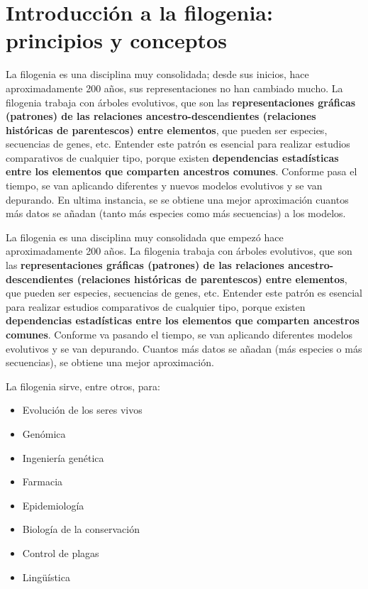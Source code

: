 \chapter{Introducción a la filogenia: principios y conceptos}
La filogenia es una disciplina muy consolidada; desde sus inicios, hace aproximadamente 200 años, sus representaciones no han cambiado mucho. La filogenia trabaja con árboles evolutivos, que son las \textbf{representaciones gráficas (patrones) de las relaciones ancestro-descendientes (relaciones históricas de parentescos) entre elementos}, que pueden ser especies, secuencias de genes, etc. Entender este patrón es esencial para realizar estudios comparativos de cualquier tipo, porque existen\textbf{ dependencias estadísticas entre los elementos que comparten ancestros comunes}. Conforme pasa el tiempo, se van aplicando diferentes y nuevos modelos evolutivos y se van depurando. En ultima instancia, se se obtiene una mejor aproximación cuantos más datos se añadan (tanto más especies como más secuencias) a los modelos.

La filogenia es una disciplina muy consolidada que empezó hace aproximadamente 200 años. La filogenia trabaja con árboles evolutivos, que son las \textbf{representaciones gráficas (patrones) de las relaciones ancestro-descendientes (relaciones históricas de parentescos) entre elementos}, que pueden ser especies, secuencias de genes, etc. Entender este patrón es esencial para realizar estudios comparativos de cualquier tipo, porque existen\textbf{ dependencias estadísticas entre los elementos que comparten ancestros comunes}. Conforme va pasando el tiempo, se van aplicando diferentes modelos evolutivos y se van depurando. Cuantos más datos se añadan (más especies o más secuencias), se obtiene una mejor aproximación.

La filogenia sirve, entre otros, para: \begin{itemize}
\item Evolución de los seres vivos
\item Genómica
\item Ingeniería genética
\item Farmacia
\item Epidemiología
\item Biología de la conservación
\item Control de plagas
\item Lingüística
\end{itemize}

